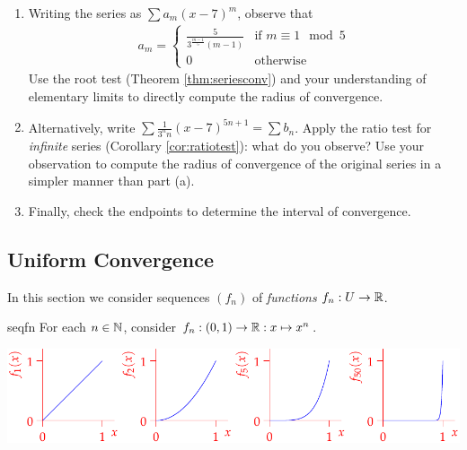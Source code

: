\begin{exercises}
\begin{enumerate}
\begin{enumerate}
	  \item Writing the series as $\sum a_m(x-7)^m$, observe that
	  \begin{gather*}
		a_m=\begin{cases}
		\frac 5{3^{\frac{m-1}5}(m-1)}&\text{if $m\equiv 1\mod 5$}\\
		0&\text{otherwise}
		\end{cases}%
		\end{gather*}
	  Use the root test (Theorem \ref{thm:seriesconv}) and your understanding of elementary limits to directly compute the radius of convergence.
	  
	  \item Alternatively, write $\sum \frac{1}{3^nn}(x-7)^{5n+1}=\sum b_n$. Apply the ratio test for \emph{infinite} series (Corollary \ref{cor:ratiotest}): what do you observe? Use your observation to compute the radius of convergence of the original series in a simpler manner than part (a).
	  
	  \item Finally, check the endpoints to determine the interval of convergence.
	\end{enumerate}
	
\end{enumerate}
\end{exercises}
\clearpage

\subsection{Uniform Convergence}\label{sec:uniformconv}

In this section we consider sequences $(f_n)$ of \emph{functions} $f_n:U\to\mathbb{R}$.

\begin{example}{}{seqfn}
For each $n\in\mathbb{N}$, consider $f_n:(0,1)\to\mathbb{R}:x\mapsto x^n$.
\begin{center}
\includegraphics{seqex1}
\end{center}
\end{example}

